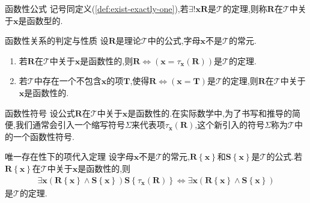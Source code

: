 \begin{definition}{函数性公式}{}
	记号同定义(\cref{def:exist-exactly-one}),若$\exists!\boldsymbol{x}\boldsymbol{R}$是$\mathcal{T}$的定理,则称$\boldsymbol{R}$在$\mathcal{T}$中关于$\boldsymbol{x}$是函数型的.
\end{definition}

\begin{metatheorem}{函数性关系的判定与性质}{}
	设$\boldsymbol{R}$是理论$\mathcal{T}$中的公式,字母$\boldsymbol{x}$不是$\mathcal{T}$的常元.
	\begin{enumerate}
		\item 若$\boldsymbol{R}$在$\mathcal{T}$中关于$\boldsymbol{x}$是函数性的,则$\boldsymbol{R}\iff\left(\boldsymbol{x}=\tau_{\boldsymbol{x}}\left(\boldsymbol{R}\right)\right)$是$\mathcal{T}$的定理.
		\item 若$\mathcal{T}$中存在一个不包含$\boldsymbol{x}$的项$\boldsymbol{T}$,使得$\boldsymbol{R}\iff\left(\boldsymbol{x}=\boldsymbol{T}\right)$是$\mathcal{T}$的定理,则$\boldsymbol{R}$在$\mathcal{T}$中关于$\boldsymbol{x}$是函数性的.
	\end{enumerate}
\end{metatheorem}

\begin{definition}{函数性符号}{}
	设公式$\boldsymbol{R}$在$\mathcal{T}$中关于$\boldsymbol{x}$是函数性的.在实际数学中,为了书写和推导的简便,我们通常会引入一个缩写符号$\Sigma$来代表项$\tau_{\boldsymbol{x}}\left(\boldsymbol{R}\right)$,这个新引入的符号$\Sigma$称为$\mathcal{T}$中的一个函数性符号.
\end{definition}

\begin{metatheorem}{唯一存在性下的项代入定理}{}
	设字母$\boldsymbol{x}$不是$\mathcal{T}$的常元,$\boldsymbol{R}\left\{\boldsymbol{x}\right\}$和$\boldsymbol{S}\left\{\boldsymbol{x}\right\}$是$\mathcal{T}$的公式.若$\boldsymbol{R}\left\{\boldsymbol{x}\right\}$在$\mathcal{T}$中关于$\boldsymbol{x}$是函数性的,则
	\begin{align*}
		\exists\boldsymbol{x}\left(\boldsymbol{R}\left\{\boldsymbol{x}\right\}\wedge\boldsymbol{S}\left\{\boldsymbol{x}\right\}\right)\boldsymbol{S}\left\{\tau_{\boldsymbol{x}}\left(\boldsymbol{R}\right)\right\}\iff\exists\boldsymbol{x}\left(\boldsymbol{R}\left\{\boldsymbol{x}\right\}\wedge\boldsymbol{S}\left\{\boldsymbol{x}\right\}\right)
	\end{align*}
	是$\mathcal{T}$的定理.
\end{metatheorem}
